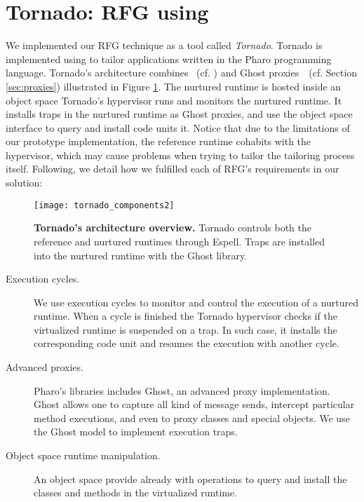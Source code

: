 \section{Tornado: RFG using \Vtt} \label{sec:rfg_implementation}

We implemented our RFG technique as a tool called \emph{Tornado}. Tornado is implemented using \Vtt to tailor applications written in the Pharo programming language.
Tornado's architecture combines \Vtt~(cf. ) and Ghost proxies~\cite{Mart14z}~(cf. Section \ref{sec:proxies}) illustrated in Figure \ref{fig:tornado_code units}. The nurtured runtime is hosted inside an object space Tornado's hypervisor runs and monitors the nurtured runtime. It installs traps in the nurtured runtime as Ghost proxies, and use the object space interface to query and install code units it. Notice that due to the limitations of our prototype implementation, the reference runtime cohabits with the hypervisor, which may cause problems when trying to tailor the tailoring process itself. Following, we detail how we fulfilled each of RFG's requirements in our solution:

\begin{figure}[ht]
\begin{center}
\texttt{[image: tornado\_components2]}
\caption{\textbf{Tornado's architecture overview.} Tornado controls both the reference and nurtured runtimes through Espell. Traps are installed into the nurtured runtime with the Ghost library.\label{fig:tornado_code units}}
\end{center}
\end{figure}

\begin{description}
\item[Execution cycles.] We use \Vtt execution cycles to monitor and control the execution of a nurtured runtime. When a cycle is finished the Tornado hypervisor checks if the virtualized runtime is suspended on a trap. In such case, it installs the corresponding code unit and resumes the execution with another cycle.

\item[Advanced proxies.] Pharo's libraries includes Ghost, an advanced proxy implementation. Ghost allows one to capture all kind of message sends, intercept particular method executions, and even to proxy classes and special objects. We use the Ghost model to implement execution traps.

\item[Object space runtime manipulation.] An object space provide already with operations to query and install the classes and methods in the virtualized runtime.

\end{description}

